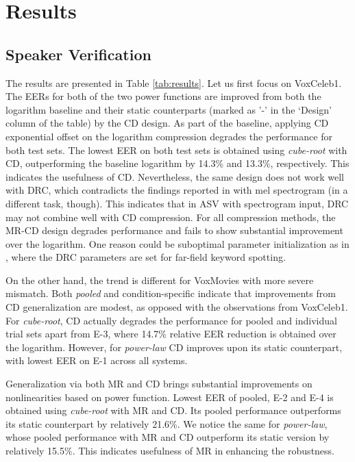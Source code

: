 \documentclass{article}
\begin{document}
\section{Results}
\label{sec:results}

\subsection{Speaker Verification}
The results are presented in Table \ref{tab:results}. Let us first focus on VoxCeleb1. The EERs for both of the two power functions are improved from both the logarithm baseline and their static counterparts (marked as '-' in the `Design' column of the table) by the CD design. 
As part of the baseline, applying CD exponential offset on the logarithm compression degrades the performance for both test sets. The lowest EER on both test sets is obtained using \emph{cube-root} with CD, outperforming the baseline logarithm by 14.3\% and 13.3\%, respectively. This indicates the usefulness of CD. Nevertheless, the same design does not work well with DRC, which contradicts the findings reported in \cite{pcen_2017} with mel spectrogram (in a different task, though). This indicates that in ASV with spectrogram input, DRC may not combine well with CD compression.
For all compression methods, the MR-CD design degrades performance and fails to show substantial improvement over the logarithm. One reason could be suboptimal parameter initialization as in \cite{pcen_2017}, where the DRC parameters are set for far-field keyword spotting.

On the other hand, the trend is different for VoxMovies with more severe mismatch. Both \emph{pooled} and condition-specific indicate that improvements from CD generalization are modest, as opposed with the observations from VoxCeleb1. For \emph{cube-root}, CD actually degrades the performance for pooled and individual trial sets apart from E-3, where 14.7\% relative EER reduction is obtained over the logarithm. However, for \emph{power-law} CD improves upon its static counterpart, with lowest EER on E-1 across all systems.

Generalization via both MR and CD brings substantial improvements on nonlinearities based on power function. Lowest EER of pooled, E-2 and E-4 is obtained using \emph{cube-root} with MR and CD. Its pooled performance outperforms its static counterpart by relatively 21.6\%. We notice the same for \emph{power-law}, whose pooled performance with MR and CD outperform its static version by relatively 15.5\%. This indicates usefulness of MR in enhancing the robustness. 
\end{document}
